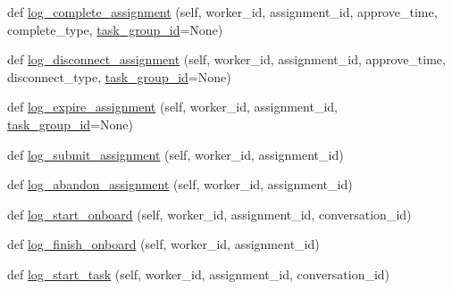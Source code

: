 \begin{DoxyCompactItemize}
\item 
def \hyperlink{classparlai_1_1mturk_1_1core_1_1dev_1_1mturk__data__handler_1_1MTurkDataHandler_a07f6dfb250fe119f1fdd44c58e6c05aa}{log\+\_\+complete\+\_\+assignment} (self, worker\+\_\+id, assignment\+\_\+id, approve\+\_\+time, complete\+\_\+type, \hyperlink{classparlai_1_1mturk_1_1core_1_1dev_1_1mturk__data__handler_1_1MTurkDataHandler_af4bebaca067ce2d388fe76ee8859e1bd}{task\+\_\+group\+\_\+id}=None)
\item 
def \hyperlink{classparlai_1_1mturk_1_1core_1_1dev_1_1mturk__data__handler_1_1MTurkDataHandler_a42409b508f2b135f6d02c80f39aee466}{log\+\_\+disconnect\+\_\+assignment} (self, worker\+\_\+id, assignment\+\_\+id, approve\+\_\+time, disconnect\+\_\+type, \hyperlink{classparlai_1_1mturk_1_1core_1_1dev_1_1mturk__data__handler_1_1MTurkDataHandler_af4bebaca067ce2d388fe76ee8859e1bd}{task\+\_\+group\+\_\+id}=None)
\item 
def \hyperlink{classparlai_1_1mturk_1_1core_1_1dev_1_1mturk__data__handler_1_1MTurkDataHandler_ab175fd5970bfd7b24751ad99e7b99111}{log\+\_\+expire\+\_\+assignment} (self, worker\+\_\+id, assignment\+\_\+id, \hyperlink{classparlai_1_1mturk_1_1core_1_1dev_1_1mturk__data__handler_1_1MTurkDataHandler_af4bebaca067ce2d388fe76ee8859e1bd}{task\+\_\+group\+\_\+id}=None)
\item 
def \hyperlink{classparlai_1_1mturk_1_1core_1_1dev_1_1mturk__data__handler_1_1MTurkDataHandler_a5a9a1246250044f6f13117c899285c82}{log\+\_\+submit\+\_\+assignment} (self, worker\+\_\+id, assignment\+\_\+id)
\item 
def \hyperlink{classparlai_1_1mturk_1_1core_1_1dev_1_1mturk__data__handler_1_1MTurkDataHandler_a6f53c1208c4e3b71be96c4f3e96dab2e}{log\+\_\+abandon\+\_\+assignment} (self, worker\+\_\+id, assignment\+\_\+id)
\item 
def \hyperlink{classparlai_1_1mturk_1_1core_1_1dev_1_1mturk__data__handler_1_1MTurkDataHandler_aa084ae52cbcc1fdce7e5a20f079f3f47}{log\+\_\+start\+\_\+onboard} (self, worker\+\_\+id, assignment\+\_\+id, conversation\+\_\+id)
\item 
def \hyperlink{classparlai_1_1mturk_1_1core_1_1dev_1_1mturk__data__handler_1_1MTurkDataHandler_a520efb5a04ffab6b689c0562997f76e0}{log\+\_\+finish\+\_\+onboard} (self, worker\+\_\+id, assignment\+\_\+id)
\item 
def \hyperlink{classparlai_1_1mturk_1_1core_1_1dev_1_1mturk__data__handler_1_1MTurkDataHandler_ac8a4ba8bd6942424ff47149189c027a3}{log\+\_\+start\+\_\+task} (self, worker\+\_\+id, assignment\+\_\+id, conversation\+\_\+id)

\end{DoxyCompactItemize}
